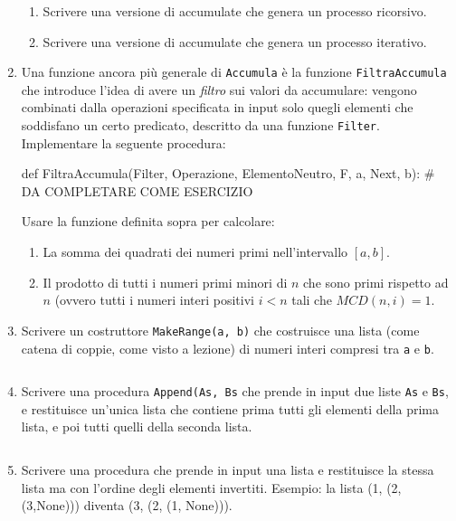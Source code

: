 \documentclass[11pt,a4]{article}
\newcommand{\mybox}[2]{$\quad$\fbox{
\begin{minipage}{#1cm}
\hfill\vspace{#2cm}
\end{minipage}
}}
\begin{document}
\begin{enumerate}
\begin{enumerate}
\item Scrivere una versione di accumulate che genera un processo ricorsivo. 
\item Scrivere una versione di accumulate che genera un processo iterativo. 
\end{enumerate}

\item Una funzione ancora più generale di {\tt Accumula} è la funzione {\tt FiltraAccumula} che introduce l'idea di 
avere un {\it filtro} sui valori da accumulare: vengono combinati dalla operazioni specificata in input solo quegli elementi
che soddisfano un certo predicato, descritto da una funzione {\tt Filter}. Implementare la seguente procedura:
\begin{python}
def FiltraAccumula(Filter, Operazione, ElementoNeutro, F, a, Next, b):
    # DA COMPLETARE COME ESERCIZIO
\end{python}
Usare la funzione definita sopra per calcolare:
\begin{enumerate}
\item La somma dei quadrati dei numeri primi nell'intervallo $[a,b]$.
\item Il prodotto di tutti i numeri primi minori di $n$ che sono primi rispetto ad $n$ (ovvero tutti i numeri interi positivi
$i < n$ tali che $MCD(n,i) = 1$.
\end{enumerate}

\item Scrivere un costruttore {\tt MakeRange(a, b)} che costruisce una lista (come catena di coppie, come visto a lezione)
di numeri interi compresi tra {\tt a} e {\tt b}.

\mybox{15}{1.5}

\item Scrivere una procedura {\tt Append(As, Bs} che prende in input due liste {\tt As} e {\tt Bs}, 
e restituisce un'unica lista che contiene prima tutti gli elementi della prima lista, e poi tutti quelli della seconda lista.

\mybox{15}{2.0}
 
\item Scrivere una procedura che prende in input una lista e restituisce la stessa lista ma con l'ordine degli elementi invertiti. 
Esempio: la lista (1, (2, (3,None))) diventa (3, (2, (1, None))).


\end{enumerate}
\end{document}
